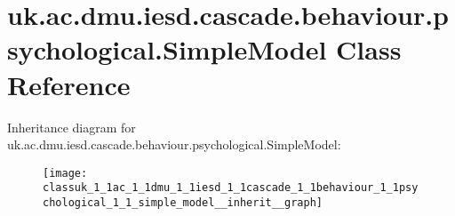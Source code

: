 \hypertarget{classuk_1_1ac_1_1dmu_1_1iesd_1_1cascade_1_1behaviour_1_1psychological_1_1_simple_model}{\section{uk.\-ac.\-dmu.\-iesd.\-cascade.\-behaviour.\-psychological.\-Simple\-Model Class Reference}
\label{classuk_1_1ac_1_1dmu_1_1iesd_1_1cascade_1_1behaviour_1_1psychological_1_1_simple_model}
}


Inheritance diagram for uk.\-ac.\-dmu.\-iesd.\-cascade.\-behaviour.\-psychological.\-Simple\-Model\-:\nopagebreak
\begin{figure}[H]
\begin{center}
\leavevmode
\texttt{[image: classuk\_1\_1ac\_1\_1dmu\_1\_1iesd\_1\_1cascade\_1\_1behaviour\_1\_1psychological\_1\_1\_simple\_model\_\_inherit\_\_graph]}
\end{center}
\end{figure}
